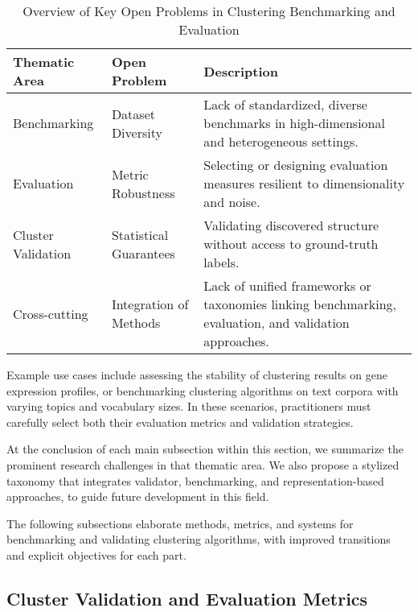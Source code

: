 \documentclass[sigconf]{acmart}
\begin{document}
\begin{table*}[htbp]
\centering
\caption{Overview of Key Open Problems in Clustering Benchmarking and Evaluation}
\label{tab:open_problems_benchmarking}
\begin{adjustbox}{max width=\textwidth}
\begin{tabular}{@{}lll@{}}
\toprule
Thematic Area & Open Problem & Description \\
\midrule
Benchmarking & Dataset Diversity & Lack of standardized, diverse benchmarks in high-dimensional and heterogeneous settings. \\
Evaluation & Metric Robustness & Selecting or designing evaluation measures resilient to dimensionality and noise. \\
Cluster Validation & Statistical Guarantees & Validating discovered structure without access to ground-truth labels. \\
Cross-cutting & Integration of Methods & Lack of unified frameworks or taxonomies linking benchmarking, evaluation, and validation approaches. \\
\bottomrule
\end{tabular}
\end{adjustbox}
\end{table*}

Example use cases include assessing the stability of clustering results on gene expression profiles, or benchmarking clustering algorithms on text corpora with varying topics and vocabulary sizes. In these scenarios, practitioners must carefully select both their evaluation metrics and validation strategies.

At the conclusion of each main subsection within this section, we summarize the prominent research challenges in that thematic area. We also propose a stylized taxonomy that integrates validator, benchmarking, and representation-based approaches, to guide future development in this field.

The following subsections elaborate methods, metrics, and systems for benchmarking and validating clustering algorithms, with improved transitions and explicit objectives for each part.

\subsection{Cluster Validation and Evaluation Metrics}
\end{document}
